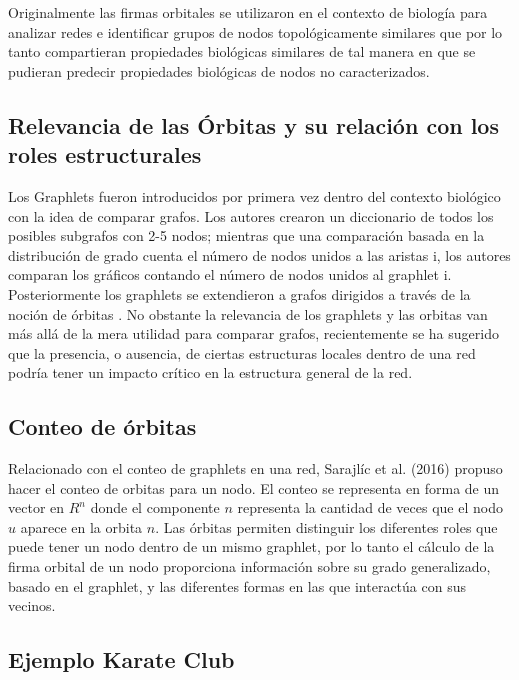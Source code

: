 Originalmente las firmas orbitales se utilizaron en el contexto de biología para analizar redes e identificar grupos de nodos topológicamente similares que por lo tanto compartieran propiedades biológicas similares \cite{milenkovic_uncovering_2008} de tal manera en que se pudieran predecir propiedades biológicas de nodos no caracterizados.

\subsection{Relevancia de las Órbitas y su relación con los roles estructurales}

Los Graphlets fueron introducidos por primera vez dentro del contexto biológico con la idea de comparar grafos. Los autores crearon un diccionario de todos los posibles subgrafos con 2-5 nodos; mientras que una comparación basada en la distribución de grado cuenta el número de nodos unidos a las aristas i, los autores comparan los gráficos contando el número de nodos unidos al graphlet i. Posteriormente los graphlets se extendieron a grafos dirigidos a través de la noción de órbitas \citep{sarajlic_graphlet-based_2016}. No obstante la relevancia de los graphlets y las orbitas van más allá de la mera utilidad para comparar grafos, recientemente se ha sugerido que la presencia, o ausencia, de ciertas estructuras locales dentro de una red podría tener un impacto crítico en la estructura general de la red.

\subsection{Conteo de órbitas}

Relacionado con el conteo de graphlets en una red, Sarajlíc et al. (2016) \cite{sarajlic_graphlet-based_2016} propuso hacer el conteo de orbitas para un nodo. El conteo se representa en forma de un vector en ${R}^{n}$ donde el componente $n$ representa la cantidad de veces que el nodo $u$ aparece en la orbita $n$. Las órbitas permiten distinguir los diferentes roles que puede tener un nodo dentro de un mismo graphlet, por lo tanto el cálculo de la firma orbital de un nodo proporciona información sobre su grado generalizado, basado en el graphlet, y las diferentes formas en las que interactúa con sus vecinos. 

\subsection{Ejemplo Karate Club}

